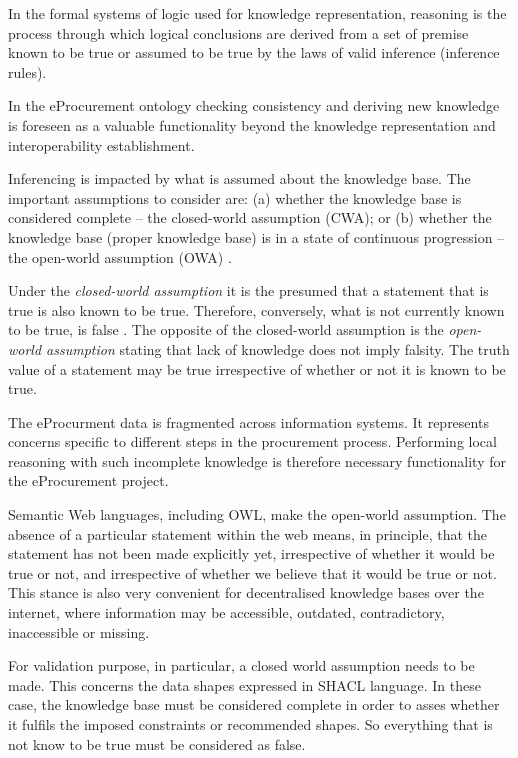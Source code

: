 	In the formal systems of logic used for knowledge representation, reasoning is the process through which logical conclusions are derived from a set of premise known to be true or assumed to be true by the laws of valid inference (inference rules). 
	
	In the eProcurement ontology checking consistency and deriving new knowledge is foreseen as a valuable functionality beyond the knowledge representation and interoperability establishment.
	
	Inferencing is impacted by what is assumed about the knowledge base. The important assumptions to consider are: (a) whether the knowledge base is considered complete -- the closed-world assumption (CWA); or (b) whether the knowledge base (proper knowledge base) is in a state of continuous progression -- the open-world assumption (OWA) \cite{damasio2006supporting}.
	
	Under the \textit{closed-world assumption} it is the presumed that a statement that is true is also known to be true. Therefore, conversely, what is not currently known to be true, is false \citep{reiter1981closed}.
	The opposite of the closed-world assumption is the \textit{open-world assumption} stating that lack of knowledge does not imply falsity. The truth value of a statement may be true irrespective of whether or not it is known to be true. 
		
	The eProcurment data is fragmented across information systems. It represents concerns specific to different steps in the procurement process. Performing local reasoning with such incomplete knowledge is therefore necessary functionality for the eProcurement project. 
		
	Semantic Web languages, including OWL, make the open-world assumption. The absence of a particular statement within the web means, in principle, that the statement has not been made explicitly yet, irrespective of whether it would be true or not, and irrespective of whether we believe that it would be true or not. This stance is also very convenient for decentralised knowledge bases over the internet, where information may be accessible, outdated, contradictory, inaccessible or missing\cite{damasio2006supporting}. 
	
	For validation purpose, in particular, a closed world assumption needs to be made. This concerns the data shapes expressed in SHACL language. In these case, the knowledge base must be considered complete in order to asses whether it fulfils the imposed constraints or recommended shapes. So everything that is not know to be true must be considered as false. 
	

